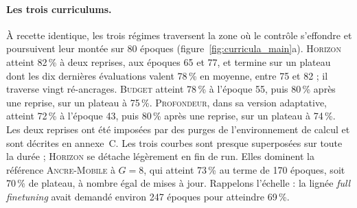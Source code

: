 \documentclass[11pt,a4paper]{article}
\begin{document}
\paragraph{Les trois curriculums.} À recette identique, les trois régimes traversent la zone où le contrôle s'effondre et poursuivent leur montée sur 80 époques (figure~\ref{fig:curricula_main}a). \textsc{Horizon} atteint 82\,\% à deux reprises, aux époques 65 et 77, et termine sur un plateau dont les dix dernières évaluations valent 78\,\% en moyenne, entre 75 et 82 ; il traverse vingt ré-ancrages. \textsc{Budget} atteint 78\,\% à l'époque 55, puis 80\,\% après une reprise, sur un plateau à 75\,\%. \textsc{Profondeur}, dans sa version adaptative, atteint 72\,\% à l'époque 43, puis 80\,\% après une reprise, sur un plateau à 74\,\%. Les deux reprises ont été imposées par des purges de l'environnement de calcul et sont décrites en annexe~C. Les trois courbes sont presque superposées sur toute la durée ; \textsc{Horizon} se détache légèrement en fin de run. Elles dominent la référence \textsc{Ancre-Mobile} à $G=8$, qui atteint 73\,\% au terme de 170 époques, soit 70\,\% de plateau, à nombre égal de mises à jour. Rappelons l'échelle : la lignée \emph{full finetuning} avait demandé environ 247 époques pour atteindre 69\,\%.
\end{document}

